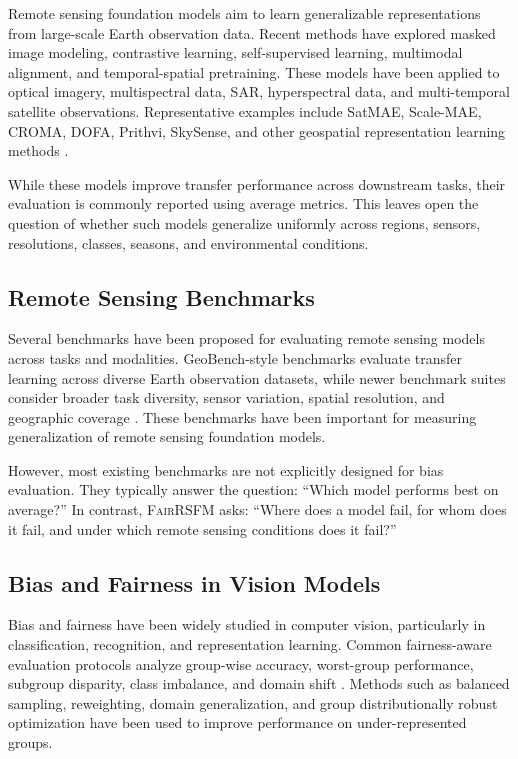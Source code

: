 \documentclass[10pt,twocolumn,letterpaper]{article}
\newcommand{\method}{\textsc{FairRSFM}\xspace}
\begin{document}
Remote sensing foundation models aim to learn generalizable representations from large-scale Earth observation data. Recent methods have explored masked image modeling, contrastive learning, self-supervised learning, multimodal alignment, and temporal-spatial pretraining. These models have been applied to optical imagery, multispectral data, SAR, hyperspectral data, and multi-temporal satellite observations. Representative examples include SatMAE, Scale-MAE, CROMA, DOFA, Prithvi, SkySense, and other geospatial representation learning methods \cite{satmae,scalemae,croma,dofa,prithvi,skysense}. 

While these models improve transfer performance across downstream tasks, their evaluation is commonly reported using average metrics. This leaves open the question of whether such models generalize uniformly across regions, sensors, resolutions, classes, seasons, and environmental conditions.

\subsection{Remote Sensing Benchmarks}

Several benchmarks have been proposed for evaluating remote sensing models across tasks and modalities. GeoBench-style benchmarks evaluate transfer learning across diverse Earth observation datasets, while newer benchmark suites consider broader task diversity, sensor variation, spatial resolution, and geographic coverage \cite{geobench,pangaea}. These benchmarks have been important for measuring generalization of remote sensing foundation models.

However, most existing benchmarks are not explicitly designed for bias evaluation. They typically answer the question: ``Which model performs best on average?'' In contrast, \method asks: ``Where does a model fail, for whom does it fail, and under which remote sensing conditions does it fail?''

\subsection{Bias and Fairness in Vision Models}

Bias and fairness have been widely studied in computer vision, particularly in classification, recognition, and representation learning. Common fairness-aware evaluation protocols analyze group-wise accuracy, worst-group performance, subgroup disparity, class imbalance, and domain shift \cite{groupdro,fairnesssurvey}. Methods such as balanced sampling, reweighting, domain generalization, and group distributionally robust optimization have been used to improve performance on under-represented groups.
\end{document}
